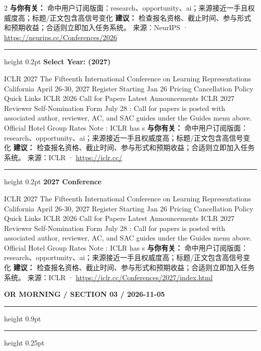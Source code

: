 \documentclass[10.5pt]{ctexart}
\begin{document}
\begin{multicols}{2}
\textbf{与你有关：} 命中用户订阅版面：research、opportunity、ai；来源接近一手且权威度高；标题/正文包含高信号变化
\textbf{建议：} 检查报名资格、截止时间、参与形式和预期收益；合适则立即加入任务系统。
{\footnotesize\color{ormuted} 来源：NeurIPS · \url{https://neurips.cc/Conferences/2026}}
\vspace{2mm}
\hrule height 0.2pt
\vspace{2mm}
{\large\bfseries Select Year: (2027)}\par
ICLR 2027 The Fifteenth International Conference on Learning Representations California April 26-30, 2027 Register Starting Jan 26 Pricing Cancellation Policy Quick Links ICLR 2026 Call for Papers Latest Announcements ICLR 2027 Reviewer Self-Nomination Form July 28 : Call for papers is posted with associated author, reviewer, AC, and SAC guides under the Guides menu above. Official Hotel Group Rates Note : ICLR has s
\textbf{与你有关：} 命中用户订阅版面：research、opportunity、ai；来源接近一手且权威度高；标题/正文包含高信号变化
\textbf{建议：} 检查报名资格、截止时间、参与形式和预期收益；合适则立即加入任务系统。
{\footnotesize\color{ormuted} 来源：ICLR · \url{https://iclr.cc/}}
\vspace{2mm}
\hrule height 0.2pt
\vspace{2mm}
{\large\bfseries 2027 Conference}\par
ICLR 2027 The Fifteenth International Conference on Learning Representations California April 26-30, 2027 Register Starting Jan 26 Pricing Cancellation Policy Quick Links ICLR 2026 Call for Papers Latest Announcements ICLR 2027 Reviewer Self-Nomination Form July 28 : Call for papers is posted with associated author, reviewer, AC, and SAC guides under the Guides menu above. Official Hotel Group Rates Note : ICLR has s
\textbf{与你有关：} 命中用户订阅版面：research、opportunity、ai；来源接近一手且权威度高；标题/正文包含高信号变化
\textbf{建议：} 检查报名资格、截止时间、参与形式和预期收益；合适则立即加入任务系统。
{\footnotesize\color{ormuted} 来源：ICLR · \url{https://iclr.cc/Conferences/2027/index.html}}
\end{multicols}
\newpage
{\small\bfseries OR MORNING / SECTION 03 / 2026-11-05}
\vspace{2mm}
\hrule height 0.9pt
\vspace{1.5mm}
\hrule height 0.25pt
\vspace{4mm}
\end{document}
